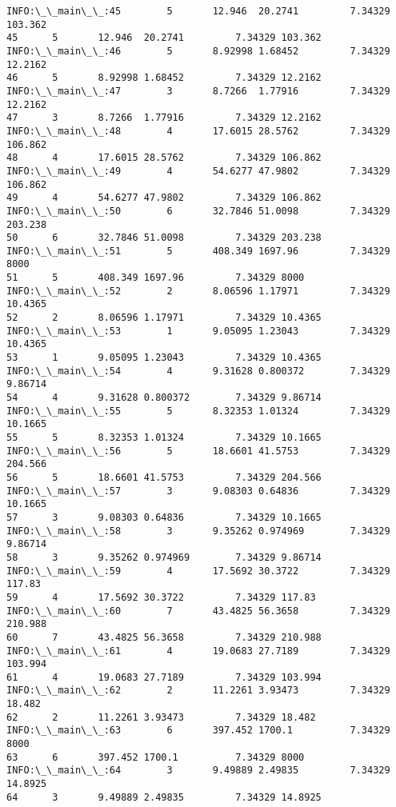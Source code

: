 \documentclass[11pt]{article}
\begin{document}
\begin{Verbatim}[commandchars=\\\{\}]
INFO:\_\_main\_\_:45        5       12.946  20.2741         7.34329 103.362
45      5       12.946  20.2741         7.34329 103.362
INFO:\_\_main\_\_:46        5       8.92998 1.68452         7.34329 12.2162
46      5       8.92998 1.68452         7.34329 12.2162
INFO:\_\_main\_\_:47        3       8.7266  1.77916         7.34329 12.2162
47      3       8.7266  1.77916         7.34329 12.2162
INFO:\_\_main\_\_:48        4       17.6015 28.5762         7.34329 106.862
48      4       17.6015 28.5762         7.34329 106.862
INFO:\_\_main\_\_:49        4       54.6277 47.9802         7.34329 106.862
49      4       54.6277 47.9802         7.34329 106.862
INFO:\_\_main\_\_:50        6       32.7846 51.0098         7.34329 203.238
50      6       32.7846 51.0098         7.34329 203.238
INFO:\_\_main\_\_:51        5       408.349 1697.96         7.34329 8000
51      5       408.349 1697.96         7.34329 8000
INFO:\_\_main\_\_:52        2       8.06596 1.17971         7.34329 10.4365
52      2       8.06596 1.17971         7.34329 10.4365
INFO:\_\_main\_\_:53        1       9.05095 1.23043         7.34329 10.4365
53      1       9.05095 1.23043         7.34329 10.4365
INFO:\_\_main\_\_:54        4       9.31628 0.800372        7.34329 9.86714
54      4       9.31628 0.800372        7.34329 9.86714
INFO:\_\_main\_\_:55        5       8.32353 1.01324         7.34329 10.1665
55      5       8.32353 1.01324         7.34329 10.1665
INFO:\_\_main\_\_:56        5       18.6601 41.5753         7.34329 204.566
56      5       18.6601 41.5753         7.34329 204.566
INFO:\_\_main\_\_:57        3       9.08303 0.64836         7.34329 10.1665
57      3       9.08303 0.64836         7.34329 10.1665
INFO:\_\_main\_\_:58        3       9.35262 0.974969        7.34329 9.86714
58      3       9.35262 0.974969        7.34329 9.86714
INFO:\_\_main\_\_:59        4       17.5692 30.3722         7.34329 117.83
59      4       17.5692 30.3722         7.34329 117.83
INFO:\_\_main\_\_:60        7       43.4825 56.3658         7.34329 210.988
60      7       43.4825 56.3658         7.34329 210.988
INFO:\_\_main\_\_:61        4       19.0683 27.7189         7.34329 103.994
61      4       19.0683 27.7189         7.34329 103.994
INFO:\_\_main\_\_:62        2       11.2261 3.93473         7.34329 18.482
62      2       11.2261 3.93473         7.34329 18.482
INFO:\_\_main\_\_:63        6       397.452 1700.1          7.34329 8000
63      6       397.452 1700.1          7.34329 8000
INFO:\_\_main\_\_:64        3       9.49889 2.49835         7.34329 14.8925
64      3       9.49889 2.49835         7.34329 14.8925

\end{Verbatim}
\end{document}
